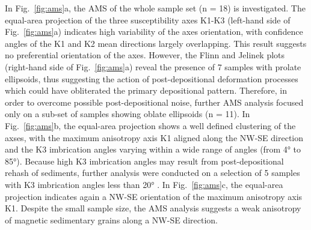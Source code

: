 \documentclass[review,times,authoryear]{elsarticle} %
\begin{document}
In Fig.~\ref{fig:ams}a, the AMS of the whole sample set (n = 18) is investigated. The equal-area projection of the three susceptibility axes K1-K3 (left-hand side of Fig.~\ref{fig:ams}a) indicates high variability of the axes orientation, with confidence angles of the K1 and K2 mean directions largely overlapping. This result suggests no preferential orientation of the axes. However, the Flinn and Jelinek plots (right-hand side of Fig.~\ref{fig:ams}a) reveal the presence of 7 samples with prolate ellipsoids, thus suggesting the action of post-depositional deformation processes which could have obliterated the primary depositional pattern. Therefore, in order to overcome possible post-depositional noise, further AMS analysis focused only on a sub-set of samples showing oblate ellipsoids (n = 11). In Fig.~\ref{fig:ams}b, the equal-area projection shows a well defined clustering of the axses, with the maximum anisotropy axis K1 aligned along the NW-SE direction and the K3 imbrication angles varying within a wide range of angles (from 4° to 85°). Because high K3 imbrication angles may result from post-depositional rehash of sediments, further analysis were conducted on a selection of 5 samples with K3 imbrication angles less than 20° \citep{Hamilton1970,Hrouda1982,Tarling1993,Liu2001,Lanza2006}. In Fig.~\ref{fig:ams}c, the equal-area projection indicates again a NW-SE orientation of the maximum anisotropy axis K1. Despite the small sample size, the AMS analysis suggests a weak anisotropy of magnetic sedimentary grains along a NW-SE direction.
\end{document}
